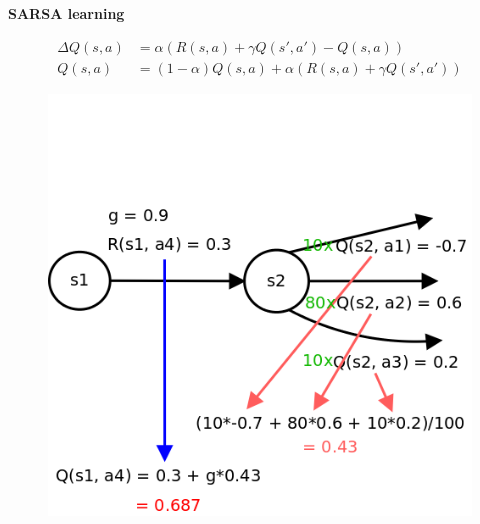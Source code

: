 \documentclass[xcolor=dvipsnames]{beamer}
\begin{document}
\begin{frame}{\bf SARSA learning}

\begin{align*}
\Delta Q(s, a) &= \alpha(R(s, a) + \gamma Q(s', a') - Q(s, a)) \\
Q(s, a) &= (1-\alpha)Q(s, a) + \alpha(R(s, a) + \gamma Q(s', a'))
\end{align*}

\begin{figure}
  \includegraphics[scale=0.23]{../../diagrams/sarsa_learning_detail.png}
\end{figure}

\end{frame}
\end{document}
